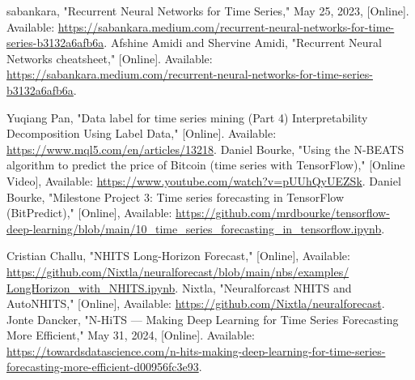 \begin{thebibliography}{00}
     sabankara, "Recurrent Neural Networks for Time Series," May 25, 2023, [Online]. Available: \href{https://sabankara.medium.com/recurrent-neural-networks-for-time-series-b3132a6afb6a}{https://sabankara.medium.com/recurrent-neural-networks-for-time-series-b3132a6afb6a}.
     Afshine Amidi and Shervine Amidi, "Recurrent Neural Networks cheatsheet," [Online]. Available: \href{https://sabankara.medium.com/recurrent-neural-networks-for-time-series-b3132a6afb6a}{https://sabankara.medium.com/recurrent-neural-networks-for-time-series-b3132a6afb6a}.

     Yuqiang Pan, "Data label for time series mining (Part 4) Interpretability Decomposition Using Label Data," [Online]. Available: \href{https://www.mql5.com/en/articles/13218}{https://www.mql5.com/en/articles/13218}.
     Daniel Bourke, "Using the N-BEATS algorithm to predict the price of Bitcoin (time series with TensorFlow)," [Online Video], Available: \href{https://www.youtube.com/watch?v=pUUhQyUEZSk}{https://www.youtube.com/watch?v=pUUhQyUEZSk}.
     Daniel Bourke, "Milestone Project 3: Time series forecasting in TensorFlow (BitPredict)," [Online], Available: \href{https://github.com/mrdbourke/tensorflow-deep-learning/blob/main/10_time_series_forecasting_in_tensorflow.ipynb}{https://github.com/mrdbourke/tensorflow-deep-learning/blob/main/10\_time\_series\_forecasting\_in\_tensorflow.ipynb}.

     Cristian Challu, "NHITS Long-Horizon Forecast," [Online], Available: \href{https://github.com/Nixtla/neuralforecast/blob/main/nbs/examples/LongHorizon_with_NHITS.ipynb}{https://github.com/Nixtla/neuralforecast/blob/main/nbs/examples/\\LongHorizon\_with\_NHITS.ipynb}.
     Nixtla, "Neuralforcast NHITS and AutoNHITS," [Online], Available: \href{https://github.com/Nixtla/neuralforecast}{https://github.com/Nixtla/neuralforecast}.
     Jonte Dancker, "N-HiTS — Making Deep Learning for Time Series Forecasting More Efficient," May 31, 2024, [Online]. Available: \href{https://towardsdatascience.com/n-hits-making-deep-learning-for-time-series-forecasting-more-efficient-d00956fc3e93}{https://towardsdatascience.com/n-hits-making-deep-learning-for-time-series-forecasting-more-efficient-d00956fc3e93}.

\end{thebibliography}
